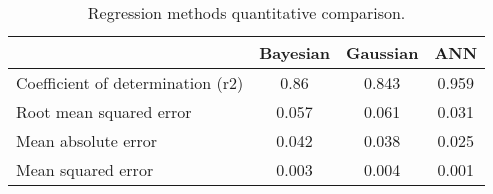 \begin{table}[htbp]
  \centering

    \begin{tabular}{lccc}
    \hline
          & Bayesian & Gaussian & ANN \\
          \hline
    Coefficient of determination (\acs{r2}) & 0.86  & 0.843 & 0.959 \\
    Root mean squared error & 0.057 & 0.061 & 0.031 \\
    Mean absolute error & 0.042 & 0.038 & 0.025 \\
    Mean squared error & 0.003 & 0.004 & 0.001 \\
    \hline
    \end{tabular}%
      \caption{Regression methods quantitative comparison.}
  \label{tab:15regressionvalues}%
\end{table}%